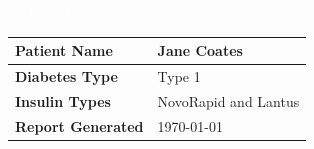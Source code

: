 \documentclass{report}
\begin{document}
\begin{titlepage}
    \BgThispage
    \vspace*{2.5cm}
    \noindent
    \textcolor{white}{\bigsf Diabetes Log}
    \vspace*{8cm}\par
    \noindent 

    {
    \doublespacing
    \Large
    \begin{center}
        \begin{tabularx}{\textwidth}{l|X}
            \hline
            \textbf{Patient Name} & Jane Coates \\ \hline
            \textbf{Diabetes Type} & Type 1 \\ \hline
            \textbf{Insulin Types} & NovoRapid and Lantus \\ \hline
            \textbf{Report Generated} & \today \\ \hline
        \end{tabularx}
    \end{center}
    }
\end{titlepage} 
\end{document}
